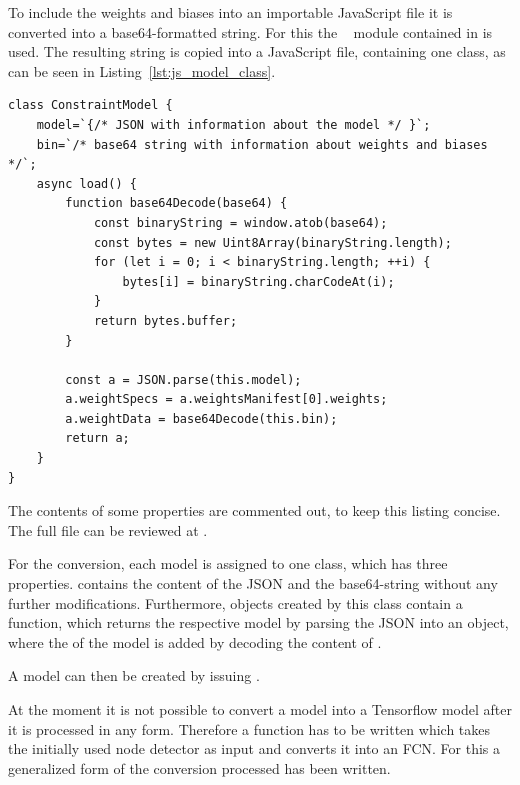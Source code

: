 To include the weights and biases into an importable JavaScript file it is converted into a base64-formatted string.
For this the ~\cite{Josefsson2018} module contained in  is used.
The resulting string is copied into a JavaScript file, containing one class, as can be seen in Listing~\ref{lst:js_model_class}.

\begin{lstlisting}[label={lst:js_model_class}, caption={[JavaScript classes for Tensorflow.js.] Class definition of one of the models providing necessary functions to be used by \code{tf.loadLayersModel} to return a usable model in JavaScript. }]
class ConstraintModel {
    model=`{/* JSON with information about the model */ }`;
    bin=`/* base64 string with information about weights and biases */`;
    async load() {
        function base64Decode(base64) {
            const binaryString = window.atob(base64);
            const bytes = new Uint8Array(binaryString.length);
            for (let i = 0; i < binaryString.length; ++i) {
                bytes[i] = binaryString.charCodeAt(i);
            }
            return bytes.buffer;
        }
    
        const a = JSON.parse(this.model);
        a.weightSpecs = a.weightsManifest[0].weights;
        a.weightData = base64Decode(this.bin);
        return a;
    }
}
\end{lstlisting}

The contents of some properties are commented out, to keep this listing concise.
The full file can be reviewed at .

For the conversion, each model is assigned to one class, which has three properties.
 contains the content of the JSON and  the base64-string without any further modifications.
Furthermore, objects created by this class contain a  function, which returns the respective model by parsing the JSON into an object, where the  of the model is added by decoding the content of .

A model can then be created by issuing .

At the moment it is not possible to convert a model into a Tensorflow model after it is processed in any form.
Therefore a function has to be written which takes the initially used node detector as input and converts it into an FCN.\@
For this a generalized form of the conversion processed has been written.

